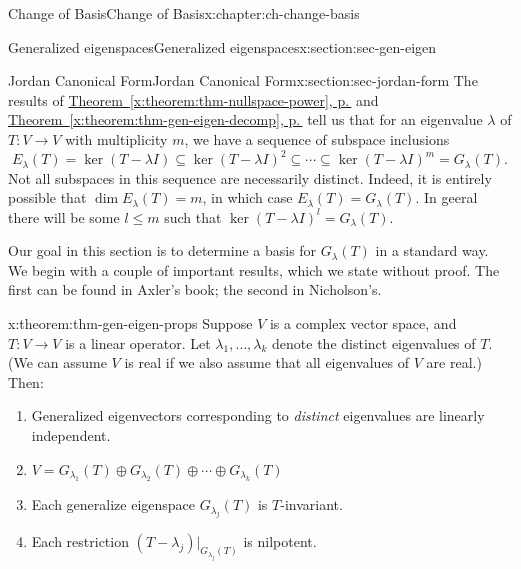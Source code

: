 \documentclass[oneside,10pt,]{book}
\newcommand{\xreffont}{\relax}
\numberwithin{equation}{section}
\begin{document}
\begin{chapterptx}{Change of Basis}{}{Change of Basis}{}{}{x:chapter:ch-change-basis}
\begin{sectionptx}{Generalized eigenspaces}{}{Generalized eigenspaces}{}{}{x:section:sec-gen-eigen}
\end{sectionptx}
%
%
\typeout{************************************************}
\typeout{************************************************}
%
\begin{sectionptx}{Jordan Canonical Form}{}{Jordan Canonical Form}{}{}{x:section:sec-jordan-form}
The results of \hyperref[x:theorem:thm-nullspace-power]{Theorem~{\xreffont\ref{x:theorem:thm-nullspace-power}}, p.\,\pageref{x:theorem:thm-nullspace-power}} and \hyperref[x:theorem:thm-gen-eigen-decomp]{Theorem~{\xreffont\ref{x:theorem:thm-gen-eigen-decomp}}, p.\,\pageref{x:theorem:thm-gen-eigen-decomp}} tell us that for an eigenvalue \(\lambda\) of \(T:V\to V\) with multiplicity \(m\), we have a sequence of subspace inclusions%
\begin{equation*}
E_\lambda(T) = \ker (T-\lambda I)\subseteq \ker (T-\lambda I)^2 \subseteq \cdots \subseteq \ker (T-\lambda I)^m = G_\lambda(T)\text{.}
\end{equation*}
Not all subspaces in this sequence are necessarily distinct. Indeed, it is entirely possible that \(\dim E_\lambda(T)=m\), in which case \(E_\lambda(T)=G_\lambda(T)\). In geeral there will be some \(l\leq m\) such that \(\ker (T-\lambda I)^l=G_\lambda(T)\).%
\par
Our goal in this section is to determine a basis for \(G_\lambda(T)\) in a standard way. We begin with a couple of important results, which we state without proof. The first can be found in Axler's book; the second in Nicholson's.%
\begin{theorem}{}{}{x:theorem:thm-gen-eigen-props}%
Suppose \(V\) is a complex vector space, and \(T:V\to V\) is a linear operator. Let \(\lambda_1,\ldots, \lambda_k\) denote the distinct eigenvalues of \(T\). (We can assume \(V\) is real if we also assume that all eigenvalues of \(V\) are real.) Then:%
\begin{enumerate}
\item{}Generalized eigenvectors corresponding to \emph{distinct} eigenvalues are linearly independent.%
\item{}\(\displaystyle V = G_{\lambda_1}(T)\oplus G_{\lambda_2}(T)\oplus \cdots \oplus G_{\lambda_k}(T)\)%
\item{}Each generalize eigenspace \(G_{\lambda_j}(T)\) is \(T\)-invariant.%
\item{}Each restriction \((T-\lambda_j)|_{G_{\lambda_j}(T)}\) is nilpotent.%
\end{enumerate}
%
\end{theorem}

\end{sectionptx}
\end{chapterptx}
\end{document}
